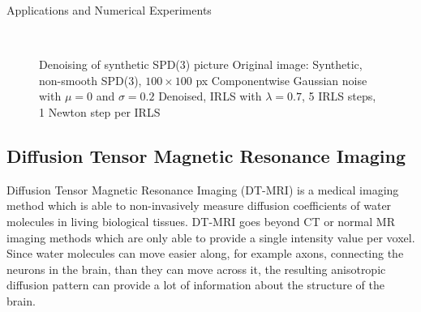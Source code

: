 \begin{chapter}{Applications and Numerical Experiments}
\begin{figure}[h!]
{    }
    \\
    \caption[Denoising of synthetic SPD(3) picture]{Denoising of synthetic SPD(3) picture
	 Original image: Synthetic, non-smooth SPD(3), $100\times 100$ px 
	 Componentwise Gaussian noise with $\mu=0$ and $\sigma=0.2$
	 Denoised, IRLS with $\lambda=0.7$, 5 IRLS steps, 1 Newton step per IRLS
	\label{fig:application_spd1}
    }
\end{figure}


\FloatBarrier
\subsection{Diffusion Tensor Magnetic Resonance Imaging} %
\label{sub:Diffusion Tensor MRI images}
Diffusion Tensor Magnetic Resonance Imaging (DT-MRI) is a medical imaging method which is able to non-invasively measure diffusion coefficients of water molecules
in living biological tissues. DT-MRI goes beyond CT or normal MR imaging methods which are only able to provide a single intensity value per voxel. Since water molecules
can move easier along, for example axons, connecting the neurons in the brain, than they can move across it, the resulting anisotropic diffusion pattern can provide a
lot of information about the structure of the brain.\\


\end{chapter}
